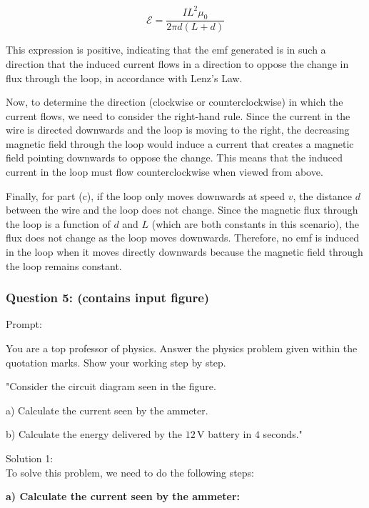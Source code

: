\documentclass[a4paper,11pt]{article}
\begin{document}
\[
\mathcal{E} = \frac{I L^2 \mu_0}{2\pi d (L + d)}
\]

This expression is positive, indicating that the emf generated is in such a direction that the induced current flows in a direction to oppose the change in flux through the loop, in accordance with Lenz's Law.

Now, to determine the direction (clockwise or counterclockwise) in which the current flows, we need to consider the right-hand rule. Since the current in the wire is directed downwards and the loop is moving to the right, the decreasing magnetic field through the loop would induce a current that creates a magnetic field pointing downwards to oppose the change. This means that the induced current in the loop must flow counterclockwise when viewed from above.

Finally, for part (c), if the loop only moves downwards at speed \( v \), the distance \( d \) between the wire and the loop does not change. Since the magnetic flux through the loop is a function of \( d \) and \( L \) (which are both constants in this scenario), the flux does not change as the loop moves downwards. Therefore, no emf is induced in the loop when it moves directly downwards because the magnetic field through the loop remains constant.

\subsubsection*{Question 5: (contains input figure)}

Prompt: 
\begin{spverbatim}
    You are a top professor of physics. Answer the physics problem given within the quotation marks. Show your working step by step.

    "Consider the circuit diagram seen in the figure. 

    a) Calculate the current seen by the ammeter.

    b) Calculate the energy delivered by the \(12\, \text{V}\) battery in \(4\) seconds."
\end{spverbatim}

\bigskip

\noindent Solution 1: \\

To solve this problem, we need to do the following steps:

\textbf{a) Calculate the current seen by the ammeter:}
\end{document}
